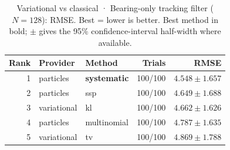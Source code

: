 \begin{table}[!htbp]
\centering
\small
\caption{Variational vs classical · Bearing-only tracking filter ($N=128$): RMSE. Best = lower is better. Best method in bold; $\pm$ gives the 95\% confidence-interval half-width where available.}
\label{tab:variational-vs-classical-bearing-only-tracking-filter-rmse}
\begin{tabular}{rllrr}
\toprule
Rank & Provider & Method & Trials & RMSE \\
\midrule
1 & particles & \textbf{systematic} & 100/100 & $\mathbf{4.548 \pm 1.657}$ \\
2 & particles & ssp & 100/100 & $4.649 \pm 1.688$ \\
3 & variational & kl & 100/100 & $4.662 \pm 1.626$ \\
4 & particles & multinomial & 100/100 & $4.787 \pm 1.635$ \\
5 & variational & tv & 100/100 & $4.869 \pm 1.788$ \\
\bottomrule
\end{tabular}
\end{table}

